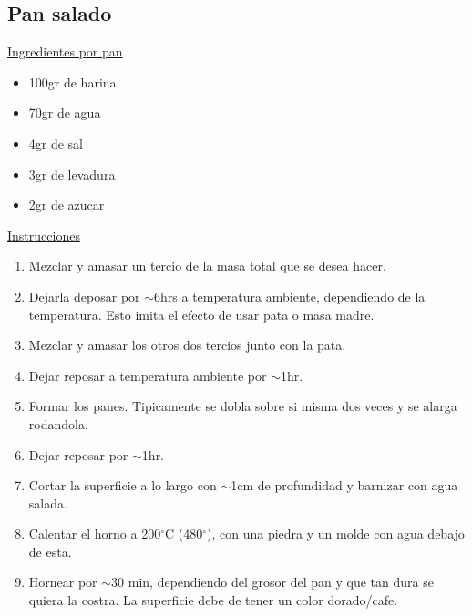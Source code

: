 \subsection{Pan salado}

\underline{Ingredientes por pan}
\begin{itemize}
\item 100gr de harina
\item 70gr de agua
\item 4gr de sal
\item 3gr de levadura
\item 2gr de azucar 
\end{itemize}

\underline{Instrucciones}
\begin{enumerate}
\item Mezclar y amasar un tercio de la masa total que se desea hacer.
\item Dejarla deposar por $\sim$6hrs a temperatura ambiente, dependiendo de la temperatura. Esto imita el efecto de usar pata o masa madre.
\item Mezclar y amasar los otros dos tercios junto con la pata.
\item Dejar reposar a temperatura ambiente por $\sim$1hr.
\item Formar los panes. Tipicamente se dobla sobre si misma dos veces y se alarga rodandola.
\item Dejar reposar por $\sim$1hr.
\item Cortar la superficie a lo largo con $\sim$1cm de profundidad y barnizar con agua salada.
\item Calentar el horno a 200$^{\circ}$C (480$^\circ$), con una piedra y un molde con agua debajo de esta.
\item Hornear por $\sim$30 min, dependiendo del grosor del pan y que tan dura se quiera la costra. La superficie debe de tener un color dorado/cafe.
\end{enumerate}
